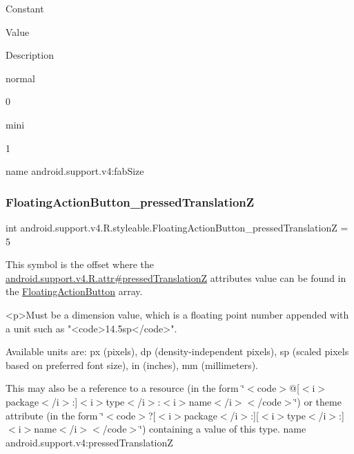 Constant

Value

Description 

{\ttfamily normal}

0

{\ttfamily mini}

1

name android.\+support.\+v4\+:fab\+Size \mbox{\label{classandroid_1_1support_1_1v4_1_1R_1_1styleable_a22d2414a00735c70b4e4b59e72e0fc1e}} 
\subsubsection{\texorpdfstring{Floating\+Action\+Button\+\_\+pressed\+TranslationZ}{FloatingActionButton\_pressedTranslationZ}}
{\footnotesize\ttfamily int android.\+support.\+v4.\+R.\+styleable.\+Floating\+Action\+Button\+\_\+pressed\+TranslationZ = 5\hspace{0.3cm}{\ttfamily [static]}}

This symbol is the offset where the \hyperlink{classandroid_1_1support_1_1v4_1_1R_1_1attr_ab422cdde74a71733904ec36f3451d234}{android.\+support.\+v4.\+R.\+attr\#pressed\+TranslationZ} attribute\textquotesingle{}s value can be found in the \hyperlink{classandroid_1_1support_1_1v4_1_1R_1_1styleable_ad3363bb32f8e5e0dde36b5e32146816b}{Floating\+Action\+Button} array.

\begin{DoxyVerb}      <p>Must be a dimension value, which is a floating point number appended with a unit such as "<code>14.5sp</code>".
\end{DoxyVerb}
 Available units are\+: px (pixels), dp (density-\/independent pixels), sp (scaled pixels based on preferred font size), in (inches), mm (millimeters). 

This may also be a reference to a resource (in the form \char`\"{}$<$code$>$@\mbox{[}$<$i$>$package$<$/i$>$\+:\mbox{]}$<$i$>$type$<$/i$>$\+:$<$i$>$name$<$/i$>$$<$/code$>$\char`\"{}) or theme attribute (in the form \char`\"{}$<$code$>$?\mbox{[}$<$i$>$package$<$/i$>$\+:\mbox{]}\mbox{[}$<$i$>$type$<$/i$>$\+:\mbox{]}$<$i$>$name$<$/i$>$$<$/code$>$\char`\"{}) containing a value of this type.  name android.\+support.\+v4\+:pressed\+TranslationZ \mbox{\label{classandroid_1_1support_1_1v4_1_1R_1_1styleable_a13b7ea4854d33e1c561b1ec784145364}} 
